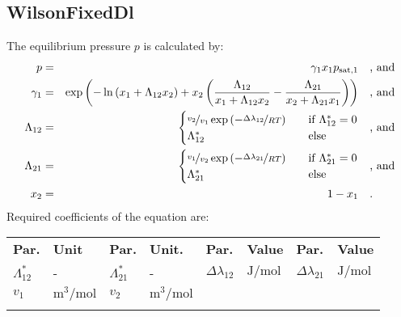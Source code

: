 \subsection{WilsonFixedDl}
\label{cha:approaches:abs:act:wilson_fdl}
%
The equilibrium pressure $p$ is calculated by:
%
\begin{equation*}
	\begin{split}
		p &=& \gamma_1 x_1 p_\mathrm{sat,1} & \quad\text{, and} \\
		\gamma_1 &=& \exp \left( - \ln \left( x_1 + \Lambda_{12} x_2 \right) + x_2 \left( \frac{\Lambda_{12}}{x_1 + \Lambda_{12} x_2} - \frac{\Lambda_{21}}{x_2 + \Lambda_{21} x_1} \right) \right) & \quad\text{, and} \\
		\Lambda_{12} &=& \begin{cases} \nicefrac{v_2}{v_1} \exp \left( - \nicefrac{\Delta\lambda_{12}}{R T} \right) & \quad \text{if } \Lambda_{12}^{*} = 0 \\ \Lambda_{12}^{*}  & \quad \text{else} \end{cases}  & \quad\text{, and} \\
		\Lambda_{21} &=& \begin{cases} \nicefrac{v_1}{v_2} \exp \left( - \nicefrac{\Delta\lambda_{21}}{R T} \right) & \quad \text{if } \Lambda_{21}^{*} = 0 \\ \Lambda_{21}^{*}  & \quad \text{else} \end{cases}  & \quad\text{, and} \\
		x_2 &=& 1 - x_1  & \quad\text{.} \\
	\end{split}
\end{equation*}
%
Required coefficients of the equation are:
%
\begin{longtable}[l]{ll|ll|ll|ll}
\toprule
\addlinespace
\textbf{Par.} & \textbf{Unit} & \textbf{Par.} &	\textbf{Unit.} & \textbf{Par.} & \textbf{Value} & \textbf{Par.} & \textbf{Value} \\
\addlinespace
\midrule
\endhead

\bottomrule
\endfoot
\bottomrule
\endlastfoot
\addlinespace

$\Lambda_{12}^{*}$ & - &$\Lambda_{21}^{*}$ & - &$\Delta\lambda_{12}$ & $\si{\joule\per\mole}$ &$\Delta\lambda_{21}$ & $\si{\joule\per\mole}$ \\
$v_1$ & $\si{\cubic\meter\per\mole}$& $v_2$ & $\si{\cubic\meter\per\mole}$ & & & & \\

\addlinespace
\end{longtable}
